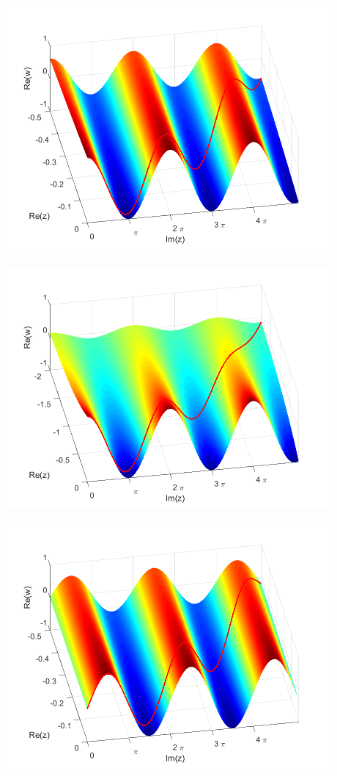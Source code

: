 \documentclass[a4paper,11pt]{article}
\begin{document}
\begin{figure}[!h]
\begin{subfigure}[c]{0.5\textwidth}
\includegraphics[width=8.5cm]{real_musg11.png}
\end{subfigure}
\begin{subfigure}[c]{0.5\textwidth}
\includegraphics[width=8.5cm]{real_musg12.png}
\end{subfigure}
\begin{subfigure}[c]{0.5\textwidth}
\includegraphics[width=8.5cm]{imag_musg11.png}
\end{subfigure}
\begin{subfigure}[c]{0.5\textwidth}

\end{subfigure}
\end{figure}
\end{document}
